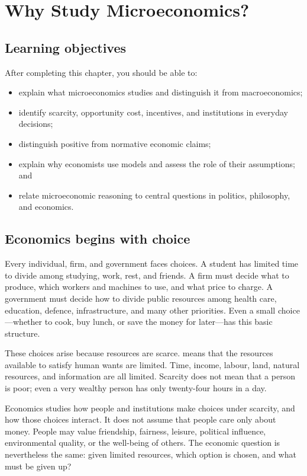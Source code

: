 \chapter{Why Study Microeconomics?}
\label{chap:introduction}

\section{Learning objectives}

After completing this chapter, you should be able to:

\begin{itemize}
  \item explain what microeconomics studies and distinguish it from macroeconomics;
  \item identify scarcity, opportunity cost, incentives, and institutions in everyday decisions;
  \item distinguish positive from normative economic claims;
  \item explain why economists use models and assess the role of their assumptions; and
  \item relate microeconomic reasoning to central questions in politics, philosophy, and economics.
\end{itemize}

\section{Economics begins with choice}

Every individual, firm, and government faces choices. A student has limited
time to divide among studying, work, rest, and friends. A firm must decide
what to produce, which workers and machines to use, and what price to charge.
A government must decide how to divide public resources among health care,
education, defence, infrastructure, and many other priorities. Even a small
choice---whether to cook, buy lunch, or save the money for later---has this
basic structure.

These choices arise because resources are scarce. 
 means that the resources available to satisfy human wants are limited. Time, income, labour, land, natural resources, and information are all limited. Scarcity does not mean that a person is poor; even a very wealthy person has only twenty-four hours in a day.

Economics studies how people and institutions make choices under scarcity, and
how those choices interact. It does not assume that people care only about
money. People may value friendship, fairness, leisure, political influence,
environmental quality, or the well-being of others. The economic question is
nevertheless the same: given limited resources, which option is chosen, and
what must be given up?


